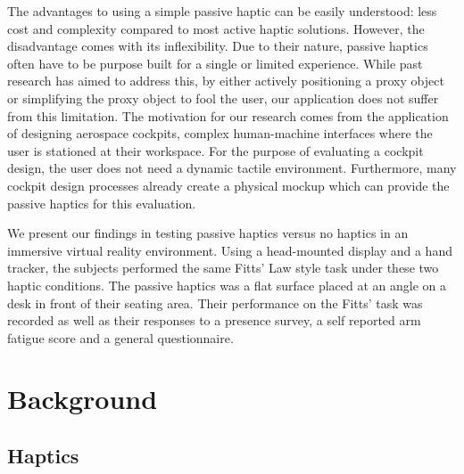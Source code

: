 The advantages to using a simple passive haptic can be easily understood: less cost and complexity compared to most active haptic solutions.
However, the disadvantage comes with its inflexibility.
Due to their nature, passive haptics often have to be purpose built for a single or limited experience.
While past research has aimed to address this, by either actively positioning a proxy object or simplifying the proxy object to fool the user, our application does not suffer from this limitation.
The motivation for our research comes from the application of designing aerospace cockpits, complex human-machine interfaces where the user is stationed at their workspace.
For the purpose of evaluating a cockpit design, the user does not need a dynamic tactile environment.
Furthermore, many cockpit design processes already create a physical mockup which can provide the passive haptics for this evaluation.

We present our findings in testing passive haptics versus no haptics in an immersive virtual reality environment.
Using a head-mounted display and a hand tracker, the subjects performed the same Fitts' Law style task under these two haptic conditions.
The passive haptics was a flat surface placed at an angle on a desk in front of their seating area.
Their performance on the Fitts' task was recorded as well as their responses to a presence survey, a self reported arm fatigue score and a general questionnaire.

\section{Background}

\subsection{Haptics}

